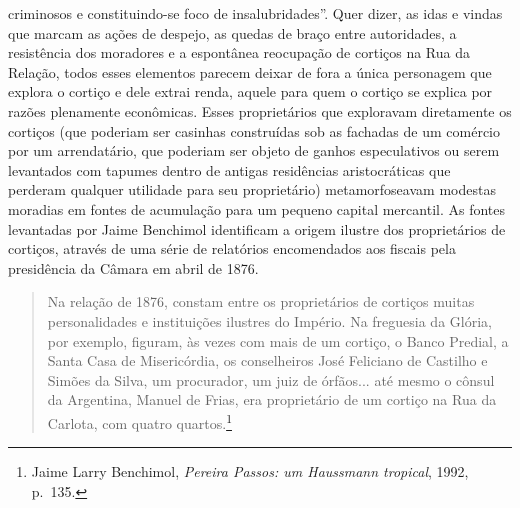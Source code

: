 criminosos e constituindo-se foco de insalubridades''. Quer dizer, as
idas e vindas que marcam as ações de despejo, as quedas de braço entre
autoridades, a resistência dos moradores e a espontânea reocupação de
cortiços na Rua da Relação, todos esses elementos parecem deixar de fora
a única personagem que explora o cortiço e dele extrai renda, aquele
para quem o cortiço se explica por razões plenamente econômicas. Esses
proprietários que exploravam diretamente os cortiços (que poderiam ser
casinhas construídas sob as fachadas de um comércio por um arrendatário,
que poderiam ser objeto de ganhos especulativos ou serem levantados com
tapumes dentro de antigas residências aristocráticas que perderam
qualquer utilidade para seu proprietário) metamorfoseavam modestas
moradias em fontes de acumulação para um pequeno capital mercantil. As
fontes levantadas por Jaime Benchimol identificam a origem ilustre dos
proprietários de cortiços, através de uma série de relatórios
encomendados aos fiscais pela presidência da Câmara em abril de 1876.

\begin{quote}
Na relação de 1876, constam entre os proprietários de cortiços muitas
personalidades e instituições ilustres do Império. Na freguesia da
Glória, por exemplo, figuram, às vezes com mais de um cortiço, o Banco
Predial, a Santa Casa de Misericórdia, os conselheiros José Feliciano de
Castilho e Simões da Silva, um procurador, um juiz de órfãos... até
mesmo o cônsul da Argentina, Manuel de Frias, era proprietário de um
cortiço na Rua da Carlota, com quatro quartos.\footnote{Jaime Larry
  Benchimol, \emph{Pereira Passos: um Haussmann tropical}, 1992, p.~135.}
\end{quote}

